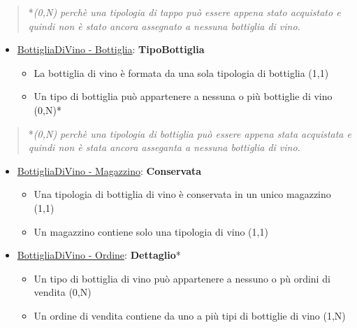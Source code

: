 \begin{verse}
	*\emph{(0,N) perchè una tipologia di tappo può essere appena stato acquistato e quindi non è stato ancora assegnato a nessuna bottiglia di vino.}
\end{verse}

\begin{itemize}
	\item \underline{BottigliaDiVino - Bottiglia}: \textbf{TipoBottiglia}
	
	\begin{itemize}
		\item La bottiglia di vino è formata da una sola tipologia di bottiglia (1,1)
		\item Un tipo di bottiglia può appartenere a nessuna o più bottiglie di vino (0,N)*
	\end{itemize}
	
\end{itemize}

\begin{verse}
	*\emph{(0,N) perchè una tipologia di bottiglia può essere appena stata acquistata e quindi non è stata ancora asseganta a nessuna bottiglia di vino.}
\end{verse}

\begin{itemize}
	\item \underline{BottigliaDiVino - Magazzino}: \textbf{Conservata}
	
	\begin{itemize}
		\item Una tipologia di bottiglia di vino è conservata in un unico magazzino (1,1)
		\item Un magazzino contiene solo una tipologia di vino (1,1)
	\end{itemize}
	
\end{itemize}

\begin{itemize}
	\item \underline{BottigliaDiVino - Ordine}: \textbf{Dettaglio}*
	
	\begin{itemize}
		\item Un tipo di bottiglia di vino può appartenere a nessuno o pù ordini di vendita (0,N)
		\item Un ordine di vendita contiene da uno a più tipi di bottiglie di vino (1,N)
	\end{itemize}
	
\end{itemize}

